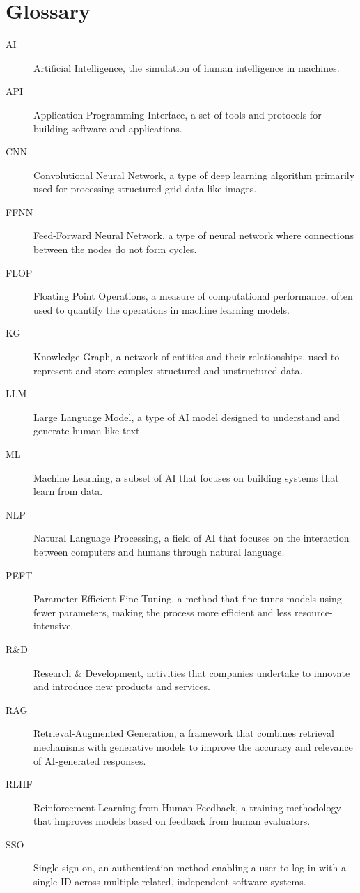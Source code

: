 \section*{Glossary}
\begin{description}
    \item[AI] Artificial Intelligence, the simulation of human intelligence in machines.
    \item[API] Application Programming Interface, a set of tools and protocols for building software and applications.
    \item[CNN] Convolutional Neural Network, a type of deep learning algorithm primarily used for processing structured grid data like images.
    \item[FFNN] Feed-Forward Neural Network, a type of neural network where connections between the nodes do not form cycles.
    \item[FLOP] Floating Point Operations, a measure of computational performance, often used to quantify the operations in machine learning models.
    \item[KG] Knowledge Graph, a network of entities and their relationships, used to represent and store complex structured and unstructured data.
    \item[LLM] Large Language Model, a type of AI model designed to understand and generate human-like text.
    \item[ML] Machine Learning, a subset of AI that focuses on building systems that learn from data.
    \item[NLP] Natural Language Processing, a field of AI that focuses on the interaction between computers and humans through natural language.
    \item[PEFT] Parameter-Efficient Fine-Tuning, a method that fine-tunes models using fewer parameters, making the process more efficient and less resource-intensive.
    \item[R\&D] Research \& Development, activities that companies undertake to innovate and introduce new products and services.
    \item[RAG] Retrieval-Augmented Generation, a framework that combines retrieval mechanisms with generative models to improve the accuracy and relevance of AI-generated responses.
    \item[RLHF] Reinforcement Learning from Human Feedback, a training methodology that improves models based on feedback from human evaluators.
    \item[SSO] Single sign-on, an authentication method enabling a user to log in with a single ID across multiple related, independent software systems.
\end{description}
